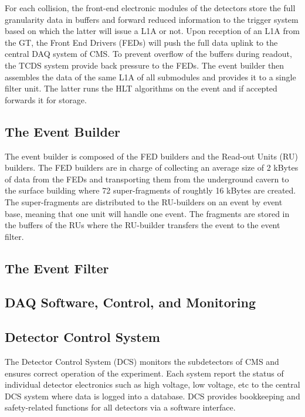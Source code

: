     For each collision, the front-end electronic modules of the detectors store the full granularity data in buffers and forward reduced information to the trigger system based on which the latter will issue a L1A or not. Upon reception of an L1A from the GT, the Front End Drivers (FEDs) will push the full data uplink to the central DAQ system of CMS. To prevent overflow of the buffers during readout, the TCDS system provide back pressure to the FEDs. The event builder then assembles the data of the same L1A of all submodules and provides it to a single filter unit. The latter runs the HLT algorithms on the event and if accepted forwards it for storage.

    \subsection{The Event Builder}

      The event builder is composed of the FED builders and the Read-out Units (RU) builders. The FED builders are in charge of collecting an average size of 2 kBytes of data from the FEDs and transporting them from the underground cavern to the surface building where 72 super-fragments of roughtly 16 kBytes are created. The super-fragments are distributed to the RU-builders on an event by event base, meaning that one unit will handle one event. The fragments are stored in the buffers of the RUs where the RU-builder transfers the event to the event filter.

    \subsection{The Event Filter}


    \subsection{DAQ Software, Control, and Monitoring}


    \subsection{Detector Control System}

      The Detector Control System (DCS) monitors the subdetectors of CMS and ensures correct operation of the experiment. Each system report the status of individual detector electronics such as high voltage, low voltage, etc to the central DCS system where data is logged into a database. DCS provides bookkeeping and safety-related functions for all detectors via a software interface.
